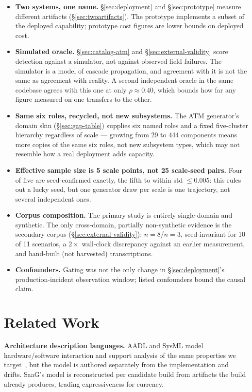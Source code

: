 \documentclass[sigconf,9pt]{acmart}
\begin{document}
\begin{itemize}
\item \textbf{Two systems, one name.} \S\ref{sec:deployment} and \S\ref{sec:prototype} measure
  different artifacts (\S\ref{sec:twoartifacts}). The prototype implements a subset of the
  deployed capability; prototype cost figures are lower bounds on deployed cost.
\item \textbf{Simulated oracle.} \S\ref{sec:catalog-atm} and \S\ref{sec:external-validity} score
  detection against a simulator, not against observed field failures. The simulator is a model of
  cascade propagation, and agreement with it is not the same as agreement with reality. A second
  independent oracle in the same codebase agrees with this one at only $\rho \approx 0.40$, which
  bounds how far any figure measured on one transfers to the other.
\item \textbf{Same six roles, recycled, not new subsystems.} The ATM generator's domain skin
  (\S\ref{sec:gap-table}) supplies six named roles and a fixed five-cluster hierarchy regardless of
  scale --- growing from 29 to 444 components means more copies of the same six roles, not new
  subsystem types, which may not resemble how a real deployment adds capacity.
\item \textbf{Effective sample size is 5 scale points, not 25 scale-seed pairs.} Four of five are
  seed-confirmed exactly, the fifth to within std $\le 0.005$: this rules out a lucky seed, but one
  generator draw per scale is one trajectory, not several independent ones.
\item \textbf{Corpus composition.} The primary study is entirely single-domain and synthetic. The
  only cross-domain, partially non-synthetic evidence is the secondary corpus
  (\S\ref{sec:external-validity}): $n=8$/$n=3$, seed-invariant for 10 of 11 scenarios, a $2\times$
  wall-clock discrepancy against an earlier measurement, and hand-built (not harvested)
  transcriptions.
\item \textbf{Confounders.} Gating was not the only change in \S\ref{sec:deployment}'s
  production-incident observation window; listed confounders bound the causal claim.
\end{itemize}

\section{Related Work}
\label{sec:relatedwork}

\textbf{Architecture description languages.} AADL and SysML model hardware/software interaction
and support analysis of the same properties we target~\cite{feilergluch2012}, but the model is
authored separately from the implementation and drifts. SaaG's model is reconstructed per
candidate build from artifacts the build already produces, trading expressiveness for currency.
\end{document}
